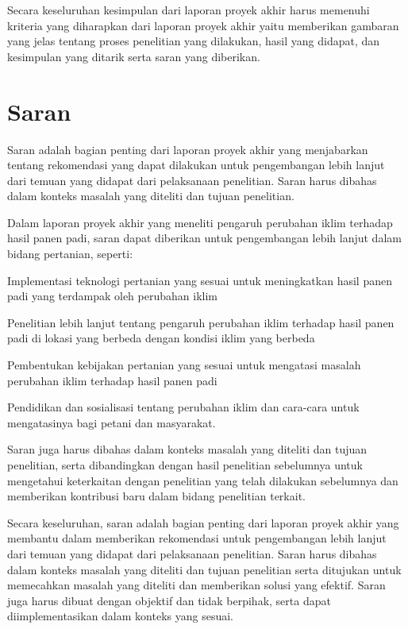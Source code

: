 Secara keseluruhan kesimpulan dari laporan proyek akhir harus memenuhi kriteria yang diharapkan dari laporan proyek akhir yaitu memberikan gambaran yang jelas tentang proses penelitian yang dilakukan, hasil yang didapat, dan kesimpulan yang ditarik serta saran yang diberikan.

\section{Saran}
Saran adalah bagian penting dari laporan proyek akhir yang menjabarkan tentang rekomendasi yang dapat dilakukan untuk pengembangan lebih lanjut dari temuan yang didapat dari pelaksanaan penelitian. Saran harus dibahas dalam konteks masalah yang diteliti dan tujuan penelitian.

Dalam laporan proyek akhir yang meneliti pengaruh perubahan iklim terhadap hasil panen padi, saran dapat diberikan untuk pengembangan lebih lanjut dalam bidang pertanian, seperti:
\begin{packed_item}
    \item Implementasi teknologi pertanian yang sesuai untuk meningkatkan hasil panen padi yang terdampak oleh perubahan iklim
    \item Penelitian lebih lanjut tentang pengaruh perubahan iklim terhadap hasil panen padi di lokasi yang berbeda dengan kondisi iklim yang berbeda
    \item Pembentukan kebijakan pertanian yang sesuai untuk mengatasi masalah perubahan iklim terhadap hasil panen padi
    \item Pendidikan dan sosialisasi tentang perubahan iklim dan cara-cara untuk mengatasinya bagi petani dan masyarakat.
\end{packed_item}

Saran juga harus dibahas dalam konteks masalah yang diteliti dan tujuan penelitian, serta dibandingkan dengan hasil penelitian sebelumnya untuk mengetahui keterkaitan dengan penelitian yang telah dilakukan sebelumnya dan memberikan kontribusi baru dalam bidang penelitian terkait.

Secara keseluruhan, saran adalah bagian penting dari laporan proyek akhir yang membantu dalam memberikan rekomendasi untuk pengembangan lebih lanjut dari temuan yang didapat dari pelaksanaan penelitian. Saran harus dibahas dalam konteks masalah yang diteliti dan tujuan penelitian serta ditujukan untuk memecahkan masalah yang diteliti dan memberikan solusi yang efektif. Saran juga harus dibuat dengan objektif dan tidak berpihak, serta dapat diimplementasikan dalam konteks yang sesuai.